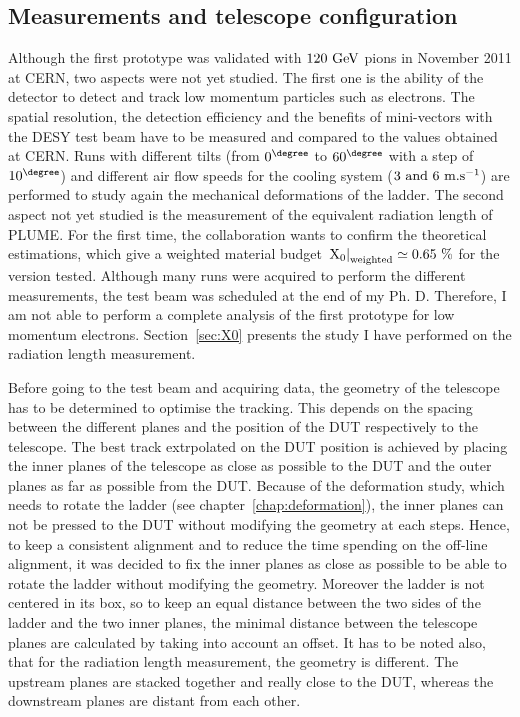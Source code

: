     \subsection{Measurements and telescope configuration}

    Although the first prototype was validated with $120~\rm{GeV}$ pions in November 2011 at CERN, two aspects were not yet studied.
    The first one is the ability of the detector to detect and track low momentum particles such as electrons.
    The spatial resolution, the detection efficiency and the benefits of mini-vectors with the DESY test beam have to be measured and compared to the values obtained at CERN.
    Runs with different tilts (from $0^{\degree}$ to $60^{\degree}$ with a step of $10^{\degree}$) and different air flow speeds for the cooling system ($3~\rm{and}~6~\rm{m.s}^{-1}$) are performed to study again the mechanical deformations of the ladder.
    The second aspect not yet studied is the measurement of the equivalent radiation length of \gls{PLUME}.
    For the first time, the collaboration wants to confirm the theoretical estimations, which give a weighted material budget $\left. \rm{X_{0}}\right|_{\rm{weighted}} \simeq 0.65~\%$ for the version tested.
    Although many runs were acquired to perform the different measurements, the test beam was scheduled at the end of my Ph. D.
    Therefore, I am not able to perform a complete analysis of the first prototype for low momentum electrons.
    Section~\ref{sec:X0} presents the study I have performed on the radiation length measurement.

    Before going to the test beam and acquiring data, the geometry of the telescope has to be determined to optimise the tracking.
    This depends on the spacing between the different planes and the position of the \gls{DUT} respectively to the telescope.
    The best track extrpolated on the \gls{DUT} position is achieved by placing the inner planes of the telescope as close as possible to the \gls{DUT} and the outer planes as far as possible from the \gls{DUT}.
    Because of the deformation study, which needs to rotate the ladder (see chapter~\ref{chap:deformation}), the inner planes can not be pressed to the \gls{DUT} without modifying the geometry at each steps.
    Hence, to keep a consistent alignment and to reduce the time spending on the off-line alignment, it was decided to fix the inner planes as close as possible to be able to rotate the ladder without modifying the geometry.
    Moreover the ladder is not centered in its box, so to keep an equal distance between the two sides of the ladder and the two inner planes, the minimal distance between the telescope planes are calculated by taking into account an offset.
    It has to be noted also, that for the radiation length measurement, the geometry is different.
    The upstream planes are stacked together and really close to the \gls{DUT}, whereas the downstream planes are distant from each other.

